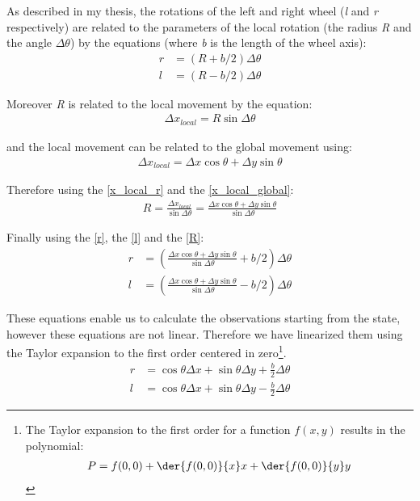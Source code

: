 As described in my thesis\supercite{Graziano:BscThesis:2019}, the rotations of the left and right wheel (\textit{l} and \textit{r} respectively) are related to the parameters of the local rotation (the radius \textit{R} and the angle $\Delta \theta$) by the equations (where \textit{b} is the length of the wheel axis):
\begin{align}
	r &= (R + b/2) \Delta \theta\label{r}\\
	l &= (R - b/2) \Delta \theta\label{l}
\end{align}

Moreover \textit{R} is related to the local movement by the equation:
\begin{align}
	\Delta x_{local} = R \sin\Delta \theta\label{x_local_r}
\end{align}

and the local movement can be related to the global movement using:
\begin{align}
	\Delta x_{local} = \Delta x \cos\theta + \Delta y \sin\theta\label{x_local_global}
\end{align}

Therefore using the \ref{x_local_r} and the \ref{x_local_global}:
\begin{align}
	R = \frac{\Delta x_{local}}{\sin\Delta \theta} = \frac{\Delta x \cos\theta + \Delta y \sin\theta}{\sin\Delta \theta}\label{R}
\end{align}

Finally using the \ref{r}, the \ref{l} and the \ref{R}:
\begin{align}
	r &= (\frac{\Delta x \cos\theta + \Delta y \sin\theta}{\sin\Delta \theta} + b/2) \Delta \theta\\
	l &= (\frac{\Delta x \cos\theta + \Delta y \sin\theta}{\sin\Delta \theta} - b/2) \Delta \theta
\end{align}

These equations enable us to calculate the observations starting from the state, however these equations are not linear. Therefore we have linearized them using the Taylor expansion to the first order centered in zero\footnote{The Taylor expansion to the first order for a function $f(x,y)$ results in the polynomial:\begin{gather*}P = f(0,0) + \der{f(0,0)}{x} x + \der{f(0,0)}{y} y\end{gather*}}.
\begin{align}
	r &= \cos\theta \Delta x + \sin\theta \Delta y + \frac{b}{2}\Delta \theta\label{r_lin}\\
	l &= \cos\theta \Delta x + \sin\theta \Delta y - \frac{b}{2}\Delta \theta\label{l_lin}
\end{align}

